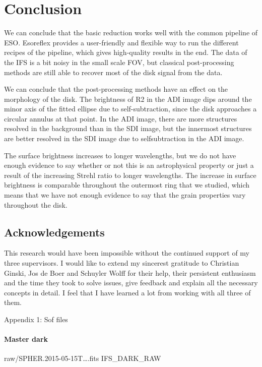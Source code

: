 \documentclass[twoside,single,12pt]{lion-msc}
\begin{document}
\chapter{Conclusion}
We can conclude that the basic reduction works well with the common pipeline of ESO. Esoreflex provides a user-friendly and flexible way to run the different recipes of the pipeline, which gives high-quality results in the end. The data of the IFS is a bit noisy in the small scale FOV, but classical post-processing methods are still able to recover most of the disk signal from the data.
\bigskip

We can conclude that the post-processing methods have an effect on the morphology of the disk. The brightness of R2 in the ADI image dips around the minor axis of the fitted ellipse due to self-subtraction, since the disk approaches a circular annulus at that point. In the ADI image, there are more structures resolved in the background than in the SDI image, but the innermost structures are better resolved in the SDI image due to selfsubtraction in the ADI image.
\bigskip

The surface brightness increases to longer wavelengths, but we do not have enough evidence to say whether or not this is an astrophysical property or just a result of the increasing Strehl ratio to longer wavelengths. The increase in surface brightness is comparable throughout the outermost ring that we studied, which means that we have not enough evidence to say that the grain properties vary throughout the disk.

\clearpage
\section*{Acknowledgements}
\small
This research would have been impossible without the continued support of my three supervisors. I would like to extend my sincerest gratitude to Christian Ginski, Jos de Boer and Schuyler Wolff for their help, their persistent enthusiasm and the time they took to solve issues, give feedback and explain all the necessary concepts in detail. I feel that I have learned a lot from working with all three of them.

\clearpage



\clearpage
\huge{Appendix 1: Sof files}
\small
\subsubsection*{Master dark}
\begin{mdframed}[linewidth = 0.3mm, linecolor = black]
raw/SPHER.2015-05-15T\dots.fits IFS\_DARK\_RAW
\end{mdframed}
\end{document}
